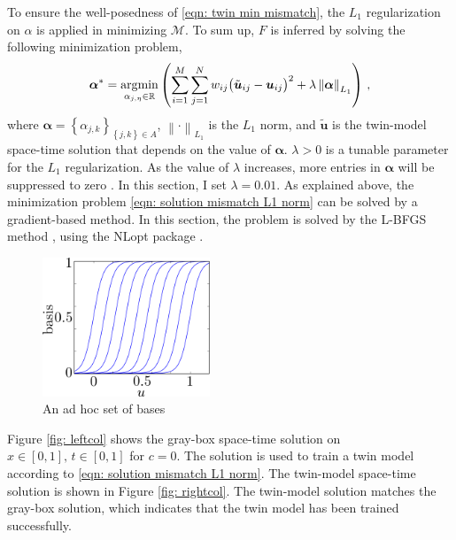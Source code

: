To ensure the well-posedness of \eqref{eqn: twin min mismatch}, the
$L_1$ regularization on $\alpha$ is applied in minimizing $\mathcal{M}$. To sum up, 
$F$ is inferred by solving the following minimization problem,
\begin{equation}
    \boldsymbol{\alpha}^* = \operatorname*{\arg\!\min}_{\alpha_{j, \eta}\in \mathbb{R}} \left(
    \sum_{i=1}^M \sum_{j=1}^N w_{ij} \big( \tilde{\boldsymbol{u}}_{ij}
     -\boldsymbol{u}_{ij}\big)^2
 + \lambda\left\|\boldsymbol{\alpha}\right\|_{L_1} \right)
    \,,
    \label{eqn: solution mismatch L1 norm}
\end{equation}
where $\boldsymbol{\alpha} = \left\{\alpha_{j,k}\right\}_{\left\{j,k\right\}\in A}$, 
$\left\|\cdot\right\|_{L_1}$ is the $L_1$ norm, and
$\tilde{\boldsymbol{u}}$ is the twin-model space-time solution that depends on the value of
$\boldsymbol{\alpha}$.
$\lambda>0$ is a tunable parameter for
the $L_1$ regularization. As the value of $\lambda$ increases, more entries in $\boldsymbol{\alpha}$
will be suppressed to zero
\cite{Lasso variable selection}. In this section, I set $\lambda=0.01$. As explained above, the
minimization problem \eqref{eqn: solution mismatch L1 norm} can be solved by a gradient-based
method. In this section, the problem is solved by the L-BFGS method \cite{LBFGS}, using the
NLopt package \cite{nlopt}.
\begin{figure}[htbp]
    \begin{center}
        \includegraphics[width=5cm]{../fixed_basis_eg.png}
        \caption{An ad hoc set of bases}
        \label{fig: sigmoid basis ad hoc}
    \end{center}
\end{figure}

Figure \ref{fig: leftcol} shows the gray-box space-time solution
on $x\in[0,1], \, t\in[0,1]$ for $c=0$. 
The solution is used to train a twin model according to \eqref{eqn: solution mismatch L1 norm}.
The twin-model space-time solution is shown in 
Figure \ref{fig: rightcol}. The twin-model solution matches the gray-box solution, which indicates that
the twin model has been trained successfully.\\

